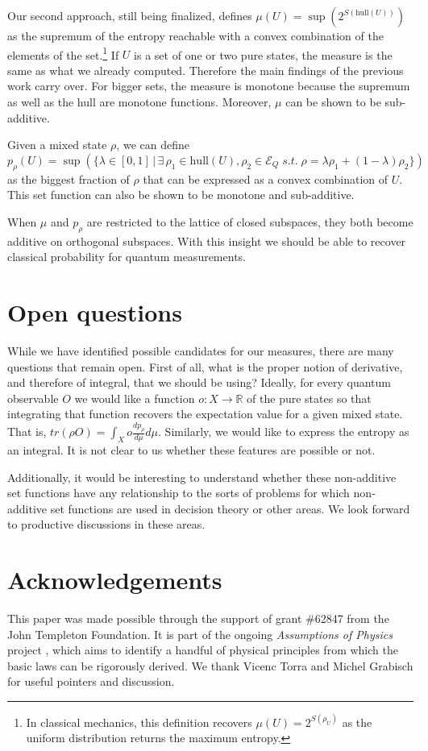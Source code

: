 \documentclass{styles/svproc}
\newcommand\hull{\mathrm{hull}}
\begin{document}
Our second approach, still being finalized\cite{aop-book}, defines $\mu(U) = \sup(2^{S(\hull(U))})$ as the supremum of the entropy reachable with a convex combination of the elements of the set.\footnote{In classical mechanics, this definition recovers $\mu(U) = 2^{S(\rho_U)}$ as the uniform distribution returns the maximum entropy.} If $U$ is a set of one or two pure states, the measure is the same as what we already computed. Therefore the main findings of the previous work carry over. For bigger sets, the measure is monotone because the supremum as well as the hull are monotone functions. Moreover, $\mu$ can be shown to be sub-additive.

Given a mixed state $\rho$, we can define $p_{\rho}(U) = \sup(\{ \lambda \in [0,1] \, | \, \exists \, \rho_1 \in \hull(U), \rho_2 \in \mathcal{E}_Q \; s.t. \;  \rho = \lambda \rho_1 + (1-\lambda) \rho_2 \})$ as the biggest fraction of $\rho$ that can be expressed as a convex combination of $U$. This set function can also be shown to be monotone and sub-additive.

When $\mu$ and $p_\rho$ are restricted to the lattice of closed subspaces, they both become additive on orthogonal subspaces. With this insight we should be able to recover classical probability for quantum measurements.

\section{Open questions}

While we have identified possible candidates for our measures, there are many questions that remain open. First of all, what is the proper notion of derivative, and therefore of integral, that we should be using? Ideally, for every quantum observable $O$ we would like a function $o : X \to \mathbb{R}$ of the pure states so that integrating that function recovers the expectation value for a given mixed state. That is, $tr(\rho O) = \int_X o \frac{dp_\rho}{d\mu} d\mu$. Similarly, we would like to express the entropy as an integral. It is not clear to us whether these features are possible or not.

Additionally, it would be interesting to understand whether these non-additive set functions have any relationship to the sorts of problems for which non-additive set functions are used in decision theory or other areas. We look forward to productive discussions in these areas.

\section{Acknowledgements}

This paper was made possible through the support of grant \#62847 from the John Templeton Foundation. It is part of the ongoing \textit{Assumptions of Physics} project \cite{aop-book}, which aims to identify a handful of physical principles from which the basic laws can be rigorously derived.  We thank Vicenc Torra and Michel Grabisch for useful pointers and discussion.

%
%


\end{document}
